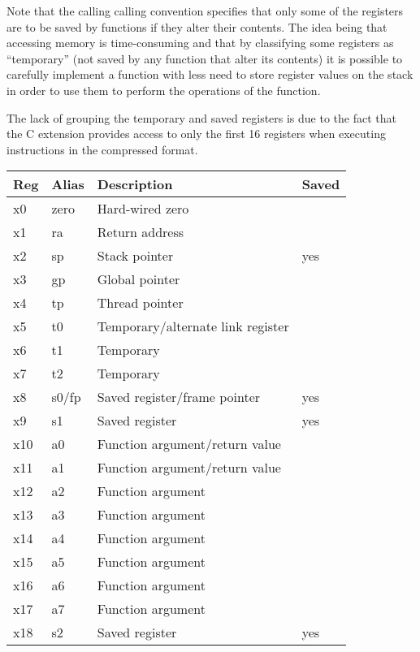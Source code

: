 Note 
that the calling calling convention specifies that only some 
of the registers are to be saved by functions if they alter their contents.
The idea being that accessing memory is time-consuming and that by
classifying some registers as ``temporary'' (not saved by any function
that alter its contents) it is possible to carefully implement a function
with less need to store register values on the stack in order to use them
to perform the operations of the function.

The lack of grouping the temporary and saved registers is due to the
fact that the C extension %
provides access to only the first 16 registers when executing instructions 
in the compressed format.  


\begin{center}
\begin{tabular}{|l|l|l|l|}
\hline
Reg	&	Alias	& Description						& Saved		\\
\hline
\hline
x0	&	zero	& Hard-wired zero					&			\\
x1	&	ra		& Return address					& 			\\
x2	&	sp		& Stack pointer						& yes		\\
x3	&	gp		& Global pointer					&			\\
x4	&	tp		& Thread pointer					&			\\
x5	&	t0		& Temporary/alternate link register	&			\\
x6	&	t1		& Temporary							&			\\
x7	&	t2		& Temporary							&			\\
x8	&	s0/fp	& Saved register/frame pointer		& yes		\\
x9	&	s1		& Saved register					& yes		\\
x10	&	a0		& Function argument/return value	& 			\\
x11	&	a1		& Function argument/return value	& 			\\
x12	&	a2		& Function argument					& 			\\
x13	&	a3		& Function argument					& 			\\
x14	&	a4		& Function argument					& 			\\
x15	&	a5		& Function argument					& 			\\
x16	&	a6		& Function argument					& 			\\
x17	&	a7		& Function argument					& 			\\
x18	&	s2		& Saved register					& yes		\\

\end{tabular}
\end{center}
